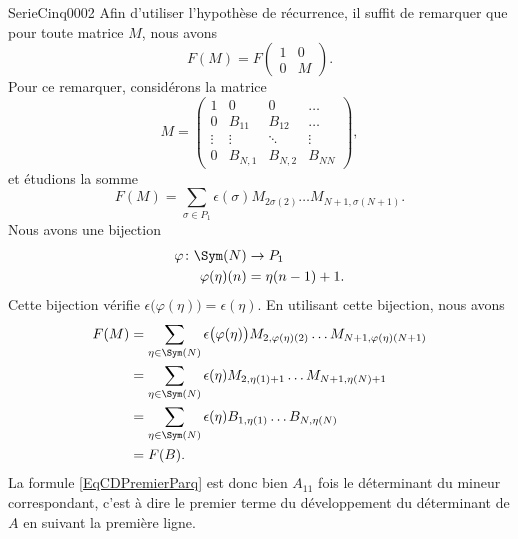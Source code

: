 \begin{corrige}{SerieCinq0002}
Afin d'utiliser l'hypothèse de récurrence, il suffit de remarquer que pour toute matrice $M$, nous avons
\begin{equation}
	F(M)=F\begin{pmatrix}
		1	&	0	\\ 
		0	&	M	
	\end{pmatrix}.
\end{equation}
Pour ce remarquer, considérons la matrice
\begin{equation}
	M=\begin{pmatrix}
		 1	&	0	&	0	&	\ldots	\\
		 0	&	B_{11}	&	B_{12}	&	\ldots	\\
		 \vdots	&	\vdots	&	\ddots	&	\vdots	\\ 
		 0	&	B_{N,1}	&	B_{N,2}	&	B_{NN}	 
	 \end{pmatrix},
\end{equation}
et étudions la somme
\begin{equation}
	F(M)=\sum_{\sigma\in P_1}\epsilon(\sigma)M_{2\sigma(2)}\ldots M_{N+1,\sigma(N+1)}.
\end{equation}
Nous avons une bijection
\begin{equation}
	\begin{aligned}
		\varphi\colon \Sym(N)&\to P_1 \\
		\varphi(\eta)(n)&=\eta(n-1)+1.
	\end{aligned}
\end{equation}
Cette bijection vérifie $\epsilon\big( \varphi(\eta) \big)=\epsilon(\eta)$. En utilisant cette bijection, nous avons
\begin{equation}
	\begin{aligned}[]
		F(M)&=\sum_{\eta\in\Sym(N)}\epsilon\big( \varphi(\eta) \big)M_{2,\varphi(\eta)(2)}\ldots M_{N+1,\varphi(\eta)(N+1)}\\
			&=\sum_{\eta\in\Sym(N)}\epsilon(\eta)M_{2,\eta(1)+1}\ldots M_{N+1,\eta(N)+1}\\
			&=\sum_{\eta\in\Sym(N)}\epsilon(\eta)B_{1,\eta(1)}\ldots B_{N,\eta(N)}\\
			&=F(B).
	\end{aligned}
\end{equation}
La formule \eqref{EqCDPremierParq} est donc bien $A_{11}$ fois le déterminant du mineur correspondant, c'est à dire le premier terme du développement du déterminant de $A$ en suivant la première ligne.


\end{corrige}
